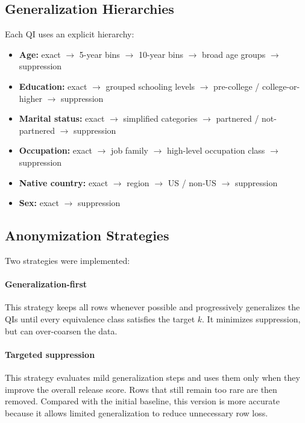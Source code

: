 \documentclass[11pt]{article}
\begin{document}
\subsection{Generalization Hierarchies}
Each QI uses an explicit hierarchy:
\begin{itemize}[leftmargin=*]
    \item \textbf{Age:} exact $\rightarrow$ 5-year bins $\rightarrow$ 10-year bins $\rightarrow$ broad age groups $\rightarrow$ suppression
    \item \textbf{Education:} exact $\rightarrow$ grouped schooling levels $\rightarrow$ pre-college / college-or-higher $\rightarrow$ suppression
    \item \textbf{Marital status:} exact $\rightarrow$ simplified categories $\rightarrow$ partnered / not-partnered $\rightarrow$ suppression
    \item \textbf{Occupation:} exact $\rightarrow$ job family $\rightarrow$ high-level occupation class $\rightarrow$ suppression
    \item \textbf{Native country:} exact $\rightarrow$ region $\rightarrow$ US / non-US $\rightarrow$ suppression
    \item \textbf{Sex:} exact $\rightarrow$ suppression
\end{itemize}

\subsection{Anonymization Strategies}
Two strategies were implemented:

\paragraph{Generalization-first}
This strategy keeps all rows whenever possible and progressively generalizes the QIs until every equivalence class satisfies the target $k$. It minimizes suppression, but can over-coarsen the data.

\paragraph{Targeted suppression}
This strategy evaluates mild generalization steps and uses them only when they improve the overall release score. Rows that still remain too rare are then removed. Compared with the initial baseline, this version is more accurate because it allows limited generalization to reduce unnecessary row loss.
\end{document}
